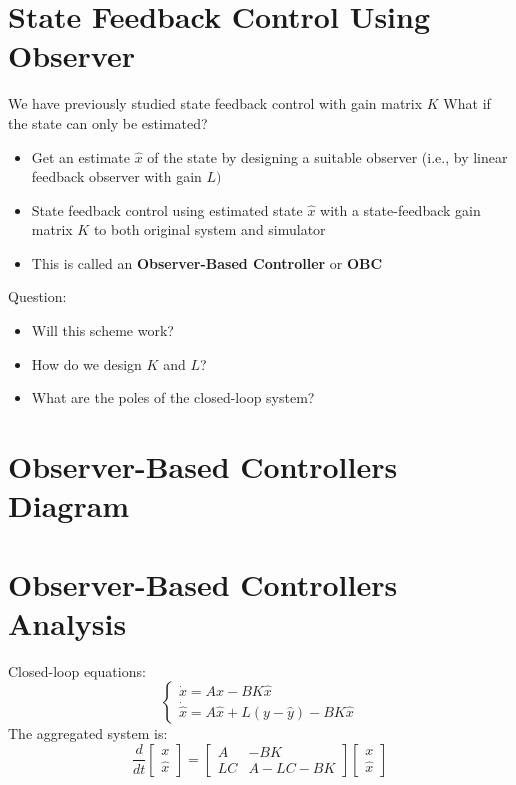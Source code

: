 \documentclass[10pt,a4paper,oneside]{article}
\begin{document}
\section{State Feedback Control Using Observer}
We have previously studied state feedback control with gain matrix $K$
What if the state can only be estimated?
\begin{itemize}
\item Get an estimate $\hat{x}$ of the state by designing a suitable observer (i.e.,
by linear feedback observer with gain $L )$
\item State feedback control using estimated state $\hat{x}$ with a state-feedback
gain matrix $K$ to both original system and simulator
\item This is called an {\bfseries Observer-Based Controller} or {\bfseries OBC}
\end{itemize}
Question:
\begin{itemize}
\item Will this scheme work?
\item How do we design $K$ and $L$?
\item What are the poles of the closed-loop system?
\end{itemize}
\section{Observer-Based Controllers Diagram}
\section{Observer-Based Controllers Analysis}
Closed-loop equations:
\[
\left\{\begin{array}{l}{\dot{x}=A x-B K \hat{x}} \\ {\dot{\hat{x}}=A \hat{x}+L(y-\hat{y})-B K \hat{x}}\end{array}\right.
\]
The aggregated system is:
\[
\frac{d}{d t}\left[\begin{array}{l}{x} \\ {\hat{x}}\end{array}\right]=\left[\begin{array}{cc}{A} & {-B K} \\ {L C} & {A-L C-B K}\end{array}\right]\left[\begin{array}{l}{x} \\ {\hat{x}}\end{array}\right]
\]
\end{document}
